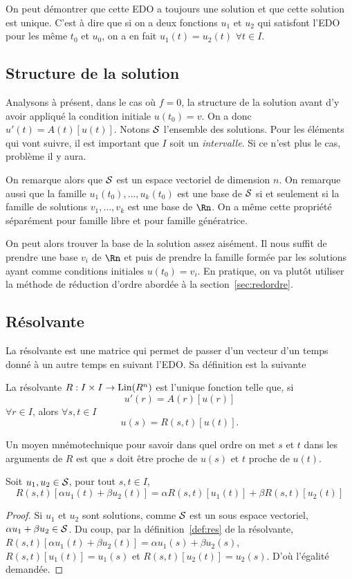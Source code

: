 On peut démontrer que cette EDO a toujours une solution et que cette
solution est unique.
C'est à dire que si on a deux fonctions $u_1$ et $u_2$ qui satisfont
l'EDO pour les même $t_0$ et $u_0$, on a en fait
$u_1(t) = u_2(t)$ $\forall t \in I$.

\subsection{Structure de la solution}
\label{sec:struct}
Analysons à présent, dans le cas où $f = 0$,
la structure de la solution avant d'y avoir appliqué la condition initiale
$u(t_0) = v$.
On a donc $u'(t) = A(t)[u(t)]$.
Notons $\mathcal{S}$ l'ensemble des solutions.
Pour les éléments qui vont suivre,
il est important que $I$ soit un \emph{intervalle}.
Si ce n'est plus le cas, problème il y aura.

On remarque alors que $\mathcal{S}$ est un espace vectoriel
de dimension $n$.
On remarque aussi que
la famille $u_1(t_0), \ldots, u_k(t_0)$ est une base de $\mathcal{S}$
si et seulement si
la famille de solutions $v_1, \ldots, v_k$
est une base de $\Rn$.
On a même cette propriété séparément pour famille libre et pour
famille génératrice.

On peut alors trouver la base de la solution assez aisément.
Il nous suffit de prendre une base $v_i$ de $\Rn$
et puis de prendre la famille
formée par les solutions ayant comme conditions initiales $u(t_0) = v_i$.
En pratique, on va plutôt utiliser la méthode de réduction d'ordre
abordée à la section~\ref{sec:redordre}.

\subsection{Résolvante}
La résolvante est une matrice qui permet de passer d'un vecteur d'un
temps donné à un autre temps en suivant l'EDO.
Sa définition est la suivante

\begin{mydef}[Résolvante]
  \label{def:res}
  La résolvante $R: I \times I \to \operatorname{Lin}(R^n)$ est l'unique fonction
  telle que, si
  \[ u'(r) = A(r)[u(r)] \]
  $\forall r \in I$, alors $\forall s, t \in I$
  \[ u(s) = R(s, t)[u(t)]. \]
\end{mydef}
Un moyen mnémotechnique pour savoir dans quel ordre on met $s$ et $t$ dans
les arguments de $R$ est que $s$ doit être proche de $u(s)$ et $t$ proche
de $u(t)$.

\begin{myprop}
  Soit $u_1,u_2 \in \mathcal{S}$, pour tout $s,t \in I$,
  \[ R(s,t)[\alpha u_1(t) + \beta u_2(t)] = \alpha R(s,t)[u_1(t)]
  + \beta R(s,t)[u_2(t)] \]
  \begin{proof}
    Si $u_1$ et $u_2$ sont solutions, comme $\mathcal{S}$ est un sous
    espace vectoriel, $\alpha u_1 + \beta u_2 \in \mathcal{S}$.
    Du coup, par la définition~\ref{def:res} de la résolvante,
    $R(s,t)[\alpha u_1(t) + \beta u_2(t)] = \alpha u_1(s) + \beta u_2(s)$,
    $R(s,t)[u_1(t)] = u_1(s)$ et $R(s,t)[u_2(t)] = u_2(s)$.
    D'où l'égalité demandée.
  \end{proof}
\end{myprop}

